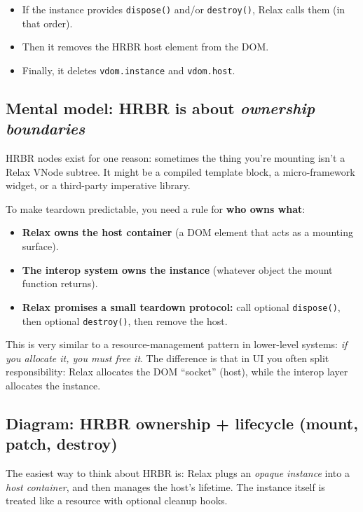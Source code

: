 \begin{itemize}
  \item If the instance provides \texttt{dispose()} and/or \texttt{destroy()}, Relax calls them (in that order).
  \item Then it removes the HRBR host element from the DOM.
  \item Finally, it deletes \texttt{vdom.instance} and \texttt{vdom.host}.
\end{itemize}

\subsection{Mental model: HRBR is about \emph{ownership boundaries}}

HRBR nodes exist for one reason: sometimes the thing you're mounting isn't a Relax VNode subtree.
It might be a compiled template block, a micro-framework widget, or a third-party imperative library.

To make teardown predictable, you need a rule for \textbf{who owns what}:

\begin{itemize}
  \item \textbf{Relax owns the host container} (a DOM element that acts as a mounting surface).
  \item \textbf{The interop system owns the instance} (whatever object the mount function returns).
  \item \textbf{Relax promises a small teardown protocol:}
    call optional \texttt{dispose()}, then optional \texttt{destroy()}, then remove the host.
\end{itemize}

This is very similar to a resource-management pattern in lower-level systems: \emph{if you allocate it, you must free it}.
The difference is that in UI you often split responsibility: Relax allocates the DOM ``socket'' (host), while the interop layer allocates the instance.

\subsection*{Diagram: HRBR ownership + lifecycle (mount, patch, destroy)}

The easiest way to think about HRBR is: Relax plugs an \emph{opaque instance} into a \emph{host container}, and then manages the host's lifetime.
The instance itself is treated like a resource with optional cleanup hooks.

